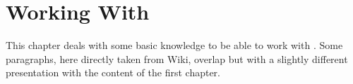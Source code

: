 \chapter{Working With \codeblocks}

This chapter deals with some basic knowledge to be able to work with \codeblocks. Some paragraphs, here directly taken from Wiki, overlap but with a slightly different presentation with the content of the first chapter.

\begin{BUILDPROCESS}

\end{BUILDPROCESS}

\begin{CREATEPROJECT}

\end{CREATEPROJECT}

\begin{DEBUGGING}

\end{DEBUGGING}

\begin{DEBUGGERSCRIPTS}

\end{DEBUGGERSCRIPTS}

\begin{MAKEFILES}

\end{MAKEFILES}

\begin{CBP2MAKE}

\end{CBP2MAKE}

\begin{INTERNATIONALIZATION}

\end{INTERNATIONALIZATION}

\begin{ADDINGLANGUAGES}

\end{ADDINGLANGUAGES}

\begin{VARIABLESTYPES}

\end{VARIABLESTYPES}

\begin{FILEFORMAT}

\end{FILEFORMAT}
